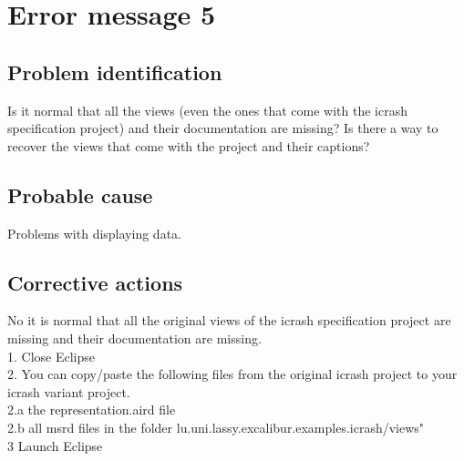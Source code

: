 \section{Error message 5}

\subsection{Problem identification}
Is it normal that all the views (even the ones that come with the icrash
specification project) and their documentation are missing? Is there a way to recover the views that come with the project and their captions?

\subsection{Probable cause}
Problems with displaying data.

\subsection{Corrective actions}
No it is normal that all the original views of the icrash specification project
are missing and their documentation are missing.\\
1. Close Eclipse\\
2. You can copy/paste the following files from the original icrash project to
your icrash variant project.\\
2.a the representation.aird file\\
2.b all msrd files in the folder lu.uni.lassy.excalibur.examples.icrash/views"\\
3 Launch Eclipse\\

